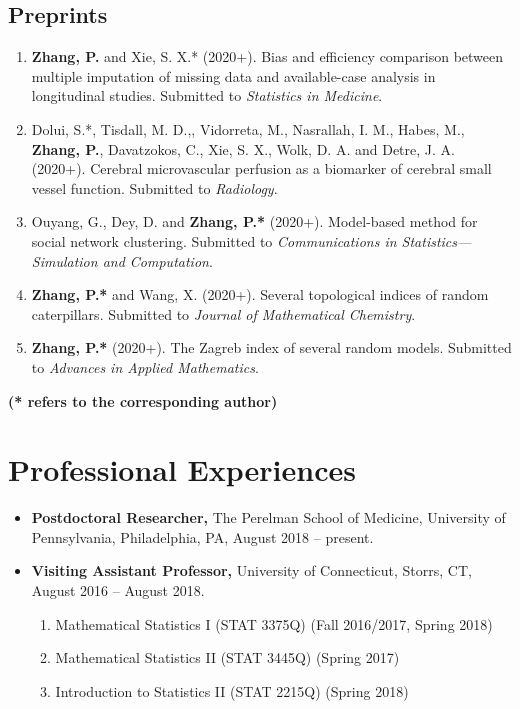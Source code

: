\documentclass[margin]{res}
\begin{document}
\begin{resume}
\subsection{Preprints}
\begin{enumerate}
	\item {\sc \bf Zhang, P.} and {\sc Xie, S. X.*} (2020+). Bias 
	and 
	efficiency comparison between multiple imputation of missing 
	data and available-case analysis in longitudinal studies. 
	Submitted to {\em Statistics in Medicine}.
	\item {\sc Dolui, S.*, Tisdall, M. D.,, Vidorreta, M., 
	Nasrallah, I. M., Habes, M.}, {\sc \bf Zhang, P.}, {\sc 
	Davatzokos, C., Xie, S. X., Wolk, D. A.} and {\sc Detre, J. A.} 
	(2020+). Cerebral microvascular perfusion as a biomarker of 
	cerebral small vessel function. Submitted to {\em Radiology}.  
	\item {\sc Ouyang, G., Dey, D.} and {\sc \bf Zhang, P.*} (2020+).
	Model-based method for social network clustering. Submitted to 
	{\em Communications in Statistics---Simulation and Computation}.
	\item {\sc \bf Zhang, P.*} and {\sc Wang, X.} (2020+). Several 
	topological indices of random caterpillars. Submitted to {\em 
	Journal of Mathematical Chemistry}.
	\item {\sc \bf Zhang, P.*} (2020+). The Zagreb index of several 
	random 
	models. Submitted to {\em Advances in Applied Mathematics}.
\end{enumerate}

{\bf (* refers to the corresponding author)}

\section{Professional Experiences}
\begin{itemize}
	\item {\bf Postdoctoral Researcher,} The Perelman School of Medicine, University of Pennsylvania, Philadelphia, PA, August 2018 -- present.
	\item {\bf Visiting Assistant Professor,} University of Connecticut, Storrs, CT, August 2016 -- August 2018.
	\begin{enumerate}
		\item Mathematical Statistics {\rm I} (STAT 3375Q) (Fall 2016/2017, Spring 2018)
		\item Mathematical Statistics {\rm II} (STAT 3445Q) (Spring 2017)
		\item Introduction to Statistics {\rm II} (STAT 2215Q) (Spring 2018)
	\end{enumerate}
	

\end{itemize}
\end{resume}
\end{document}
